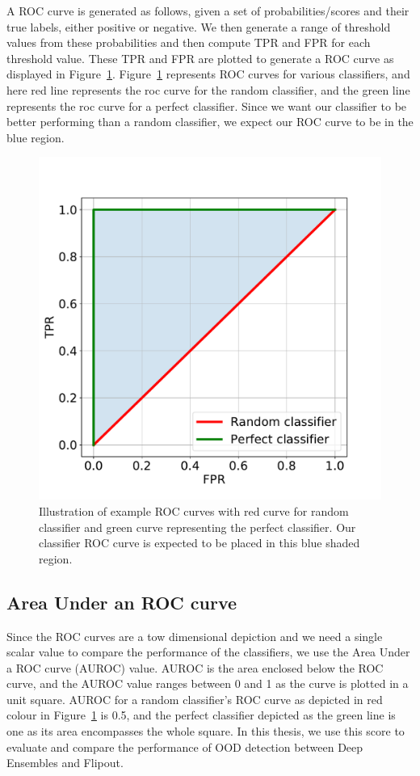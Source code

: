 A ROC curve is generated as follows, given a set of probabilities/scores and their true labels, either positive or negative.
We then generate a range of threshold values from these probabilities and then compute TPR and FPR for each threshold value.
These TPR and FPR are plotted to generate a ROC curve as displayed in Figure~\ref{fig:ROC_curve_example}. 
Figure~\ref{fig:ROC_curve_example} represents ROC curves for various classifiers, and here red line represents the roc curve for the random classifier, and the green line represents the roc curve for a perfect classifier.
Since we want our classifier to be better performing than a random classifier, we expect our ROC curve to be in the blue region.
\begin{figure}[!ht]
    \centering
    \includegraphics[scale=0.35]{images/ROC_curve_example.pdf}
    \caption{Illustration of example ROC curves with red curve for random classifier and green curve representing the perfect classifier.
    Our classifier ROC curve is expected to be placed in this blue shaded region.}
    \label{fig:ROC_curve_example}
\end{figure}

\subsection{Area Under an ROC curve}
Since the ROC curves are a tow dimensional depiction and we need a single scalar value to compare the performance of the classifiers, we use the Area Under a ROC curve (AUROC) value.
AUROC is the area enclosed below the ROC curve, and the AUROC value ranges between 0 and 1 as the curve is plotted in a unit square.
AUROC for a random classifier's ROC curve as depicted in red colour in Figure~\ref{fig:ROC_curve_example} is 0.5, and the perfect classifier depicted as the green line is one as its area encompasses the whole square.
In this thesis, we use this score to evaluate and compare the performance of OOD detection between Deep Ensembles and Flipout.


